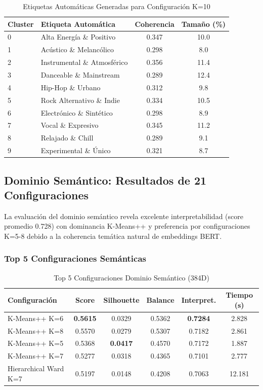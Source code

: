 \documentclass[12pt,a4paper]{article}
\begin{document}
\begin{table}[H]
\centering
\caption{Etiquetas Automáticas Generadas para Configuración K=10}
\begin{tabular}{|l|l|c|c|}
\hline
\textbf{Cluster} & \textbf{Etiqueta Automática} & \textbf{Coherencia} & \textbf{Tamaño (\%)} \\
\hline
0 & Alta Energía \& Positivo & 0.347 & 10.0 \\
\hline
1 & Acústico \& Melancólico & 0.298 & 8.0 \\
\hline
2 & Instrumental \& Atmosférico & 0.356 & 11.4 \\
\hline
3 & Danceable \& Mainstream & 0.289 & 12.4 \\
\hline
4 & Hip-Hop \& Urbano & 0.312 & 9.8 \\
\hline
5 & Rock Alternativo \& Indie & 0.334 & 10.5 \\
\hline
6 & Electrónico \& Sintético & 0.298 & 8.9 \\
\hline
7 & Vocal \& Expresivo & 0.345 & 11.2 \\
\hline
8 & Relajado \& Chill & 0.289 & 9.1 \\
\hline
9 & Experimental \& Único & 0.321 & 8.7 \\
\hline
\end{tabular}
\end{table}

\subsection{Dominio Semántico: Resultados de 21 Configuraciones}

La evaluación del dominio semántico revela excelente interpretabilidad (score promedio 0.728) con dominancia K-Means++ y preferencia por configuraciones K=5-8 debido a la coherencia temática natural de embeddings BERT.

\subsubsection{Top 5 Configuraciones Semánticas}

\begin{table}[H]
\centering
\caption{Top 5 Configuraciones Dominio Semántico (384D)}
\begin{tabular}{|l|c|c|c|c|c|}
\hline
\textbf{Configuración} & \textbf{Score} & \textbf{Silhouette} & \textbf{Balance} & \textbf{Interpret.} & \textbf{Tiempo (s)} \\
\hline
K-Means++ K=6 & \textbf{0.5615} & 0.0329 & 0.5362 & \textbf{0.7284} & 2.828 \\
\hline
K-Means++ K=8 & 0.5570 & 0.0279 & 0.5307 & 0.7182 & 2.861 \\
\hline
K-Means++ K=5 & 0.5368 & \textbf{0.0417} & 0.4570 & 0.7172 & 1.887 \\
\hline
K-Means++ K=7 & 0.5277 & 0.0318 & 0.4365 & 0.7101 & 2.777 \\
\hline
Hierarchical Ward K=7 & 0.5197 & 0.0148 & 0.4208 & 0.7063 & 12.181 \\
\hline
\end{tabular}
\end{table}
\end{document}
